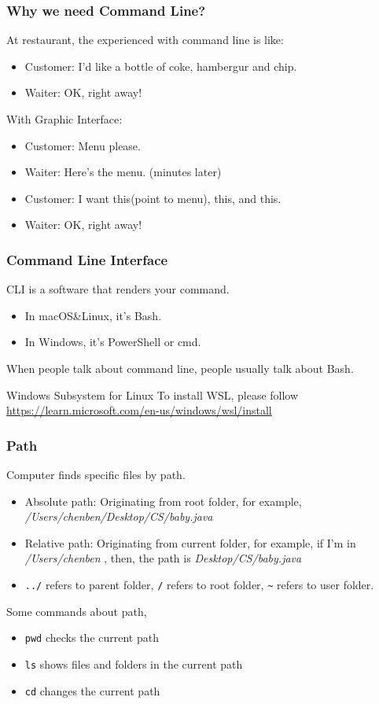 \documentclass{beamer}
\begin{document}
\begin{frame}
    \frametitle{Why we need Command Line?}
    At restaurant, the experienced with command line is like:
    \begin{itemize}
        \item Customer: I'd like a bottle of coke, hambergur and chip.
        \item Waiter: OK, right away!
    \end{itemize}
    With Graphic Interface:
    \begin{itemize}
        \item Customer: Menu please.
        \item Waiter: Here's the menu.
        \newline (minutes later)
        \item Customer: I want this(point to menu), this, and this.
        \item Waiter: OK, right away!
    \end{itemize}

\end{frame}

\begin{frame}
    \frametitle{Command Line Interface}
CLI is a software that renders your command.
\begin{itemize}
    \item In macOS\&Linux, it's Bash.
    \item In Windows, it's PowerShell or cmd.
\end{itemize}
When people talk about command line, people usually talk about Bash.
\begin{block}{Windows Subsystem for Linux}
    To install WSL, please follow \url{https://learn.microsoft.com/en-us/windows/wsl/install}
\end{block}
\end{frame}

\begin{frame}[fragile]
    \frametitle{Path}
Computer finds specific files by path.
\begin{itemize}
    \item Absolute path: Originating from root folder, for example, \textit{/Users/chenben/Desktop/CS/baby.java}
    \item Relative path: Originating from current folder, for example,\newline
    if I'm in \textit{/Users/chenben} , then, the path is \textit{Desktop/CS/baby.java}
    \item \verb|../| refers to parent folder, \verb|/| refers to root folder, \verb|~| refers to user folder.
\end{itemize}
Some commands about path,
\begin{itemize}
    \item \verb|pwd| checks the current path
    \item \verb|ls| shows files and folders in the current path
    \item \verb|cd| changes the current path
\end{itemize}
\end{frame}
\end{document}
